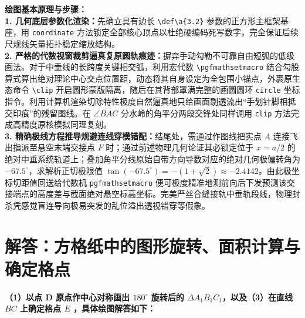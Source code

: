 {\small\color{blue!70!black}
\textbf{绘图基本原理与步骤：}\\
\textbf{1. 几何底层参数化渲染：}先确立具有边长 \texttt{\textbackslash def\textbackslash a\{3.2\}} 参数的正方形主框架基座，用 \texttt{coordinate} 方法锁定全部核心顶点以杜绝硬编码死写数字，完全保证后续尺规线矢量拓扑稳定缩放结构。\\
\textbf{2. 严格的代数视窗裁剪逼真复原圆轨痕迹：}摒弃手动勾勒不可靠自由短弧的低级画法。对于中垂线的长跨度关键相交弧，利用宏代数 \texttt{\textbackslash pgfmathsetmacro} 结合勾股算式算出绝对理论中心交点位置距，动态将其自身设定为全包围小锚点，外裹原生态命令 \texttt{\textbackslash clip} 开启圆形蒙版隔离，随后在其背部罩满完整的画圆圆环 \texttt{circle} 坐标指令。利用计算机渲染切除特性极度自然逼真地只给画面剔透流出“手划针脚相抵交印痕”的残留图线。在 $\angle BAC$ 分水岭的角平分两段交锋处同样调用 \texttt{clip} 方法完成高精度原核模拟同理复刻。\\
\textbf{3. 精确极线方程推导规避连线穿模错配：}结尾处，需通过作图线把实点 $A$ 连接飞出指派至悬空末端交接点 $F$ 时；通过前述物理几何论证其必锁定位于 $x=a/2$ 的绝对中垂系统轨道上；叠加角平分线原始自带方向导数对应的绝对几何极偏转角为 $-67.5^\circ$，求解析正切极限值 $\tan(-67.5^\circ) = -(1+\sqrt{2}) \approx -2.4142$。由此极坐标切距值回送给代数机 \texttt{pgfmathsetmacro} 便可极度精准地测前向后下发预测该交接端点的高度差与截面绝对悬空标高坐标。完美严丝合缝接轨中垂轨段线，物理封杀凭感觉盲连导向极易突发的乱位溢出透视错穿等假象。
}

\newpage

\newpage



\section{解答：方格纸中的图形旋转、面积计算与确定格点}

\vspace{0.6cm}

\textbf{（1）以点 D 原点作中心对称画出 $180^\circ$ 旋转后的 $\Delta A_1B_1C_1$，以及（3）在直线 $BC$ 上确定格点 $E$ ，具体绘图解答如下：}

\vspace{0.4cm}

